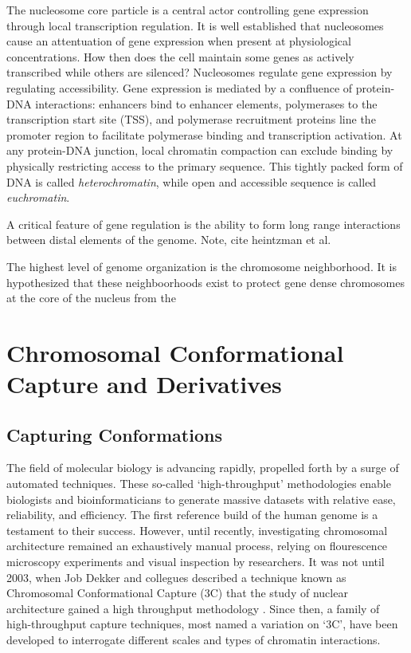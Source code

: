 \documentclass[phd,tocprelim]{cornell}
\begin{document}
The nucleosome core particle is a central actor controlling gene expression
through local transcription regulation.  It is well established that nucleosomes
cause an attentuation of gene expression when present at physiological
concentrations\cite{brown1984}\cite{lorch1987}\cite{laybourn1991}\cite{juan1994}.
How then does the cell maintain some genes as actively transcribed while others
are silenced?  Nucleosomes regulate gene expression by regulating accessibility.
Gene expression is mediated by a confluence of protein-DNA interactions:
enhancers bind to enhancer elements, polymerases to the transcription start
site (TSS), and polymerase recruitment proteins line the promoter region to
facilitate polymerase binding and transcription activation\cite{cox2008}.  At
any protein-DNA junction, local chromatin compaction can exclude binding by
physically restricting access to the primary sequence.  This tightly packed
form of DNA is called \textit{heterochromatin}, while open and accessible
sequence is called \textit{euchromatin}.

A critical feature of gene regulation is the ability to form long range
interactions between distal elements of the genome.  Note, cite heintzman et al.

The highest level of genome organization is the chromosome neighborhood.  It is
hypothesized that these neighboorhoods exist to protect gene dense chromosomes
at the core of the nucleus from the



\chapter{Chromosomal Conformational Capture and Derivatives}

\section{Capturing Conformations}

The field of molecular biology is advancing rapidly, propelled forth by a
surge of automated techniques.  These so-called `high-throughput' methodologies
enable biologists and bioinformaticians to generate massive datasets with
relative ease, reliability, and efficiency.  The first reference build of the
human genome is a testament to their success\cite{hgsc2004}.  However,
until recently, investigating chromosomal architecture remained an
exhaustively manual process, relying on flourescence microscopy experiments and
visual inspection by researchers.  It was not until 2003, when Job Dekker and
collegues described a technique known as Chromosomal Conformational Capture
(3C) that the study of nuclear architecture gained a high throughput methodology
\cite{dekker2002}. Since then, a family of high-throughput capture techniques,
most named a variation on `3C', have been developed to interrogate
different scales and types of chromatin interactions.
\end{document}
